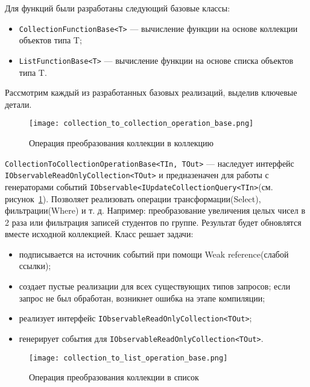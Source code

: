 Для функций были разработаны следующий базовые классы:

\begin{itemize}
  \item \lstinline[style=csharpinlinestyle]!CollectionFunctionBase<T>! --- вычисление функции на основе коллекции объектов типа T;
  \item \lstinline[style=csharpinlinestyle]!ListFunctionBase<T>! --- вычисление функции на основе списка объектов типа T.
\end{itemize}

Рассмотрим каждый из разработанных базовых реализаций, выделив ключевые детали.

\begin{figure}[ht]
\centering
  \texttt{[image: collection\_to\_collection\_operation\_base.png]}
  \caption{ Операция преобразования коллекции в коллекцию }
  \label{fig:collection_to_collection_operation_base}
\end{figure}

\lstinline[style=csharpinlinestyle]!CollectionToCollectionOperationBase<TIn, TOut>! --- наследует интерфейс \lstinline[style=csharpinlinestyle]!IObservableReadOnlyCollection<TOut>!
и предназеначен для работы с генераторами событий \lstinline[style=csharpinlinestyle]!IObservable<IUpdateCollectionQuery<TIn>!(см. рисунок~\ref{fig:collection_to_collection_operation_base}).
Позволяет реализовать операции трансформации(Select), фильтрации(Where) и т. д. Например: преобразование увеличения целых чисел в 2 раза или фильтрация записей студентов по группе.
Результат будет обновлятся вместе исходной коллекцией. Класс решает задачи:

\begin{itemize}
  \item подписывается на источник событий при помощи Weak reference(слабой ссылки)\cite{weak_reference};
  \item создает пустые реализации для всех существующих типов запросов; если запрос не был обработан, возникнет ошибка на этапе компиляции;
  \item реализует интерфейс \lstinline[style=csharpinlinestyle]!IObservableReadOnlyCollection<TOut>!;
  \item генерирует события для \lstinline[style=csharpinlinestyle]!IObservableReadOnlyCollection<TOut>!.
\end{itemize}

\begin{figure}[ht]
\centering
  \texttt{[image: collection\_to\_list\_operation\_base.png]}
  \caption{ Операция преобразования коллекции в список }
  \label{fig:collection_to_list_operation_base}
\end{figure}

